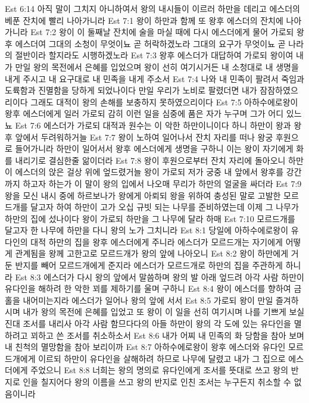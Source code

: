 Est 6:14  아직 말이 그치지 아니하여서 왕의 내시들이 이르러 하만을 데리고 에스더의 베푼 잔치에 빨리 나아가니라
Est 7:1  왕이 하만과 함께 또 왕후 에스더의 잔치에 나아가니라
Est 7:2  왕이 이 둘째날 잔치에 술을 마실 때에 다시 에스더에게 물어 가로되 왕후 에스더여 그대의 소청이 무엇이뇨 곧 허락하겠노라 그대의 요구가 무엇이뇨 곧 나라의 절반이라 할지라도 시행하겠노라
Est 7:3  왕후 에스더가 대답하여 가로되 왕이여 내가 만일 왕의 목전에서 은혜를 입었으며 왕이 선히 여기시거든 내 소청대로 내 생명을 내게 주시고 내 요구대로 내 민족을 내게 주소서
Est 7:4  나와 내 민족이 팔려서 죽임과 도륙함과 진멸함을 당하게 되었나이다 만일 우리가 노비로 팔렸더면 내가 잠잠하였으리이다 그래도 대적이 왕의 손해를 보충하지 못하였으리이다
Est 7:5  아하수에로왕이 왕후 에스더에게 일러 가로되 감히 이런 일을 심중에 품은 자가 누구며 그가 어디 있느뇨
Est 7:6  에스더가 가로되 대적과 원수는 이 악한 하만이니이다 하니 하만이 왕과 왕후 앞에서 두려워하거늘
Est 7:7  왕이 노하여 일어나서 잔치 자리를 떠나 왕궁 후원으로 들어가니라 하만이 일어서서 왕후 에스더에게 생명을 구하니 이는 왕이 자기에게 화를 내리기로 결심한줄 앎이더라
Est 7:8  왕이 후원으로부터 잔치 자리에 돌아오니 하만이 에스더의 앉은 걸상 위에 엎드렸거늘 왕이 가로되 저가 궁중 내 앞에서 왕후를 강간까지 하고자 하는가 이 말이 왕의 입에서 나오매 무리가 하만의 얼굴을 싸더라
Est 7:9  왕을 모신 내시 중에 하르보나가 왕에게 아뢰되 왕을 위하여 충성된 말로 고발한 모르드개를 달고자 하여 하만이 고가 오십 규빗 되는 나무를 준비하였는데 이제 그 나무가 하만의 집에 섰나이다 왕이 가로되 하만을 그 나무에 달라 하매
Est 7:10  모르드개를 달고자 한 나무에 하만을 다니 왕의 노가 그치니라
Est 8:1  당일에 아하수에로왕이 유다인의 대적 하만의 집을 왕후 에스더에게 주니라 에스더가 모르드개는 자기에게 어떻게 관계됨을 왕께 고한고로 모르드개가 왕의 앞에 나아오니
Est 8:2  왕이 하만에게 거둔 반지를 빼어 모르드개에게 준지라 에스더가 모르드개로 하만의 집을 주관하게 하니라
Est 8:3  에스더가 다시 왕의 앞에서 말씀하며 왕의 발 아래 엎드려 아각 사람 하만이 유다인을 해하려 한 악한 꾀를 제하기를 울며 구하니
Est 8:4  왕이 에스더를 향하여 금홀을 내어미는지라 에스더가 일어나 왕의 앞에 서서
Est 8:5  가로되 왕이 만일 즐겨하시며 내가 왕의 목전에 은혜를 입었고 또 왕이 이 일을 선히 여기시며 나를 기쁘게 보실진대 조서를 내리사 아각 사람 함므다다의 아들 하만이 왕의 각 도에 있는 유다인을 멸하려고 꾀하고 쓴 조서를 취소하소서
Est 8:6  내가 어찌 내 민족의 화 당함을 참아 보며 내 친척의 멸망함을 참아 보리이까
Est 8:7  아하수에로왕이 왕후 에스더와 유다인 모르드개에게 이르되 하만이 유다인을 살해하려 하므로 나무에 달렸고 내가 그 집으로 에스더에게 주었으니
Est 8:8  너희는 왕의 명의로 유다인에게 조서를 뜻대로 쓰고 왕의 반지로 인을 칠지어다 왕의 이름을 쓰고 왕의 반지로 인친 조서는 누구든지 취소할 수 없음이니라
